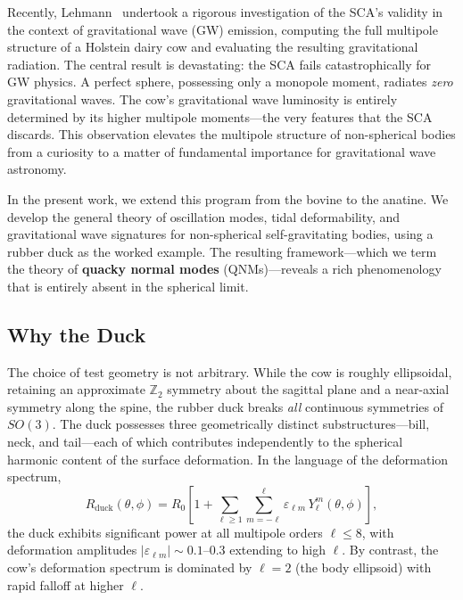 \documentclass[aps,prd,twocolumn,superscriptaddress,nofootinbib]{revtex4-2}
\begin{document}
Recently, Lehmann~\cite{Lehmann2025} undertook a rigorous investigation of
the SCA's validity in the context of gravitational wave (GW) emission,
computing the full multipole structure of a Holstein dairy cow and evaluating
the resulting gravitational radiation.
The central result is devastating: the SCA fails catastrophically for GW
physics.
A perfect sphere, possessing only a monopole moment, radiates \textit{zero}
gravitational waves.
The cow's gravitational wave luminosity is entirely determined by its higher
multipole moments---the very features that the SCA discards.
This observation elevates the multipole structure of non-spherical bodies
from a curiosity to a matter of fundamental importance for gravitational
wave astronomy.

In the present work, we extend this program from the bovine to the anatine.
We develop the general theory of oscillation modes, tidal deformability, and
gravitational wave signatures for non-spherical self-gravitating bodies,
using a rubber duck as the worked example.
The resulting framework---which we term the theory of \textbf{quacky normal
modes} (QNMs)---reveals a rich phenomenology that is entirely absent in the
spherical limit.


\subsection{Why the Duck}
\label{sec:why_duck}

The choice of test geometry is not arbitrary.
While the cow is roughly ellipsoidal, retaining an approximate
$\mathbb{Z}_2$ symmetry about the sagittal plane and a near-axial symmetry
along the spine, the rubber duck breaks \textit{all} continuous symmetries
of $SO(3)$.
The duck possesses three geometrically distinct substructures---bill, neck,
and tail---each of which contributes independently to the spherical harmonic
content of the surface deformation.
In the language of the deformation spectrum,
\begin{equation}
R_{\mathrm{duck}}(\theta, \phi) = R_0 \left[ 1 + \sum_{\ell \geq 1}
\sum_{m=-\ell}^{\ell} \varepsilon_{\ell m}\, Y_\ell^m(\theta, \phi) \right],
\label{eq:Rduck}
\end{equation}
the duck exhibits significant power at all multipole orders $\ell \leq 8$,
with deformation amplitudes $|\varepsilon_{\ell m}| \sim 0.1$--$0.3$
extending to high $\ell$.
By contrast, the cow's deformation spectrum is dominated by $\ell = 2$
(the body ellipsoid) with rapid falloff at higher $\ell$.
\end{document}
